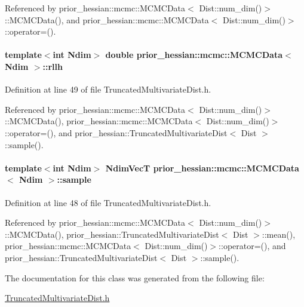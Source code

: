 Referenced by prior\+\_\+hessian\+::mcmc\+::\+M\+C\+M\+C\+Data$<$ Dist\+::num\+\_\+dim()$>$\+::\+M\+C\+M\+C\+Data(), and prior\+\_\+hessian\+::mcmc\+::\+M\+C\+M\+C\+Data$<$ Dist\+::num\+\_\+dim()$>$\+::operator=().

\paragraph[{\texorpdfstring{rllh}{rllh}}]{\setlength{\rightskip}{0pt plus 5cm}template$<$int Ndim$>$ double {\bf prior\+\_\+hessian\+::mcmc\+::\+M\+C\+M\+C\+Data}$<$ Ndim $>$\+::rllh}\hypertarget{classprior__hessian_1_1mcmc_1_1MCMCData_a5d6330749b57307761c9b7124b94f337}{}\label{classprior__hessian_1_1mcmc_1_1MCMCData_a5d6330749b57307761c9b7124b94f337}


Definition at line 49 of file Truncated\+Multivariate\+Dist.\+h.



Referenced by prior\+\_\+hessian\+::mcmc\+::\+M\+C\+M\+C\+Data$<$ Dist\+::num\+\_\+dim()$>$\+::\+M\+C\+M\+C\+Data(), prior\+\_\+hessian\+::mcmc\+::\+M\+C\+M\+C\+Data$<$ Dist\+::num\+\_\+dim()$>$\+::operator=(), and prior\+\_\+hessian\+::\+Truncated\+Multivariate\+Dist$<$ Dist $>$\+::sample().

\paragraph[{\texorpdfstring{sample}{sample}}]{\setlength{\rightskip}{0pt plus 5cm}template$<$int Ndim$>$ {\bf Ndim\+VecT} {\bf prior\+\_\+hessian\+::mcmc\+::\+M\+C\+M\+C\+Data}$<$ Ndim $>$\+::sample}\hypertarget{classprior__hessian_1_1mcmc_1_1MCMCData_a97efdedc5edd49ece7550418f122ad4d}{}\label{classprior__hessian_1_1mcmc_1_1MCMCData_a97efdedc5edd49ece7550418f122ad4d}


Definition at line 48 of file Truncated\+Multivariate\+Dist.\+h.



Referenced by prior\+\_\+hessian\+::mcmc\+::\+M\+C\+M\+C\+Data$<$ Dist\+::num\+\_\+dim()$>$\+::\+M\+C\+M\+C\+Data(), prior\+\_\+hessian\+::\+Truncated\+Multivariate\+Dist$<$ Dist $>$\+::mean(), prior\+\_\+hessian\+::mcmc\+::\+M\+C\+M\+C\+Data$<$ Dist\+::num\+\_\+dim()$>$\+::operator=(), and prior\+\_\+hessian\+::\+Truncated\+Multivariate\+Dist$<$ Dist $>$\+::sample().



The documentation for this class was generated from the following file\+:\begin{DoxyCompactItemize}
\item 
\hyperlink{TruncatedMultivariateDist_8h}{Truncated\+Multivariate\+Dist.\+h}\end{DoxyCompactItemize}

